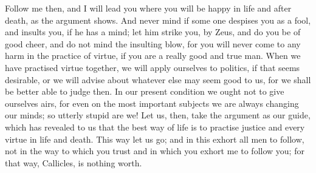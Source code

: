 \documentclass[11pt,letter]{article}
\begin{document}
\par  Follow me then, and I will lead you where you will be happy in life and after death, as the argument shows. And never mind if some one despises you as a fool, and insults you, if he has a mind; let him strike you, by Zeus, and do you be of good cheer, and do not mind the insulting blow, for you will never come to any harm in the practice of virtue, if you are a really good and true man. When we have practised virtue together, we will apply ourselves to politics, if that seems desirable, or we will advise about whatever else may seem good to us, for we shall be better able to judge then. In our present condition we ought not to give ourselves airs, for even on the most important subjects we are always changing our minds; so utterly stupid are we! Let us, then, take the argument as our guide, which has revealed to us that the best way of life is to practise justice and every virtue in life and death. This way let us go; and in this exhort all men to follow, not in the way to which you trust and in which you exhort me to follow you; for that way, Callicles, is nothing worth.

\par 
\end{document}
